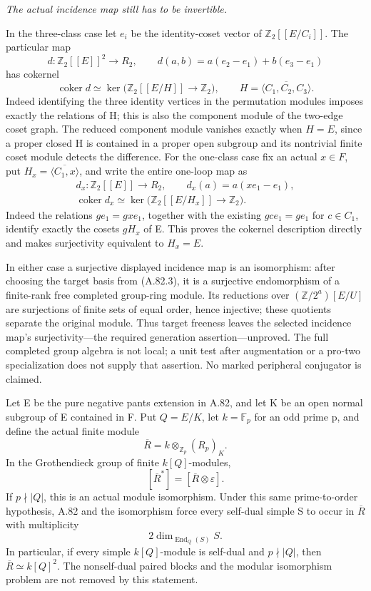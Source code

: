 \emph{The actual incidence map still has to be invertible.}\par
In the three-class case let \(e_i\) be the identity-coset
vector of \(\mathbb Z_2[[E/C_i]]\). The particular map
\[
 d:\mathbb Z_2[[E]]^2\longrightarrow R_2,
       \qquad d(a,b)=a(e_2-e_1)+b(e_3-e_1)
 \tag{A.82.10}
\]
has cokernel
\[
 \operatorname{coker}d\simeq
 \ker\bigl(\mathbb Z_2[[E/H]]\longrightarrow\mathbb Z_2\bigr),
       \qquad H=\overline{\langle C_1,C_2,C_3\rangle}.
 \tag{A.82.11}
\]
Indeed identifying the three identity vertices in the
permutation modules imposes exactly the relations of H;
this is also the component module of the two-edge coset
graph. The reduced component module vanishes exactly when
\(H=E\), since a proper closed H is contained in a proper
open subgroup and its nontrivial finite coset module detects
the difference. For the one-class case fix an actual \(x\in F\),
put \(H_x=\overline{\langle C_1,x\rangle}\), and
write the entire one-loop map as
\[
 \begin{gathered}
 d_x:\mathbb Z_2[[E]]\longrightarrow R_2,
       \qquad d_x(a)=a(xe_1-e_1),\\
 \operatorname{coker}d_x\simeq
 \ker\bigl(\mathbb Z_2[[E/H_x]]\longrightarrow\mathbb Z_2\bigr).
 \end{gathered}
 \tag{A.82.12}
\]
Indeed the relations \(ge_1=gxe_1\), together with the
existing \(gce_1=ge_1\) for \(c\in C_1\), identify
exactly the cosets \(gH_x\) of E. This proves the
cokernel description directly and makes surjectivity
equivalent to \(H_x=E\).

In either case a surjective displayed incidence map is
an isomorphism: after choosing the target basis from
(A.82.3), it is a surjective endomorphism of a finite-rank
free completed group-ring module. Its reductions over
\((\mathbb Z/2^a)[E/U]\) are surjections of finite
sets of equal order, hence injective; these quotients
separate the original module. Thus target freeness
leaves the selected incidence map's surjectivity---the
required generation assertion---unproved.
The full completed group algebra is not local; a unit test
after augmentation or a pro-two specialization does not
supply that assertion. No marked peripheral conjugator is
claimed.


Let E be the pure negative pants extension in A.82, and
let K be an open normal subgroup of E contained in F.
Put \(Q=E/K\), let \(k=\mathbb F_p\) for an odd
prime p, and define the actual finite module
\[
             \overline R=k\otimes_{\mathbb Z_p}(R_p)_K.
 \tag{A.83.1}
\]
In the Grothendieck group of finite \(k[Q]\)-modules,
\[
                    [\overline R^*]=[\overline R\otimes\varepsilon].
 \tag{A.83.2}
\]
If \(p\nmid|Q|\), this is an actual module isomorphism.
Under this same prime-to-order hypothesis, A.82 and the
isomorphism force every self-dual simple S to
occur in \(\overline R\) with multiplicity
\[
                         2\dim_{\operatorname{End}_Q(S)}S.
 \tag{A.83.3}
\]
In particular, if every simple \(k[Q]\)-module is
self-dual and \(p\nmid|Q|\), then
\(\overline R\simeq k[Q]^2\).
The nonself-dual paired blocks and the modular isomorphism
problem are not removed by this statement.

